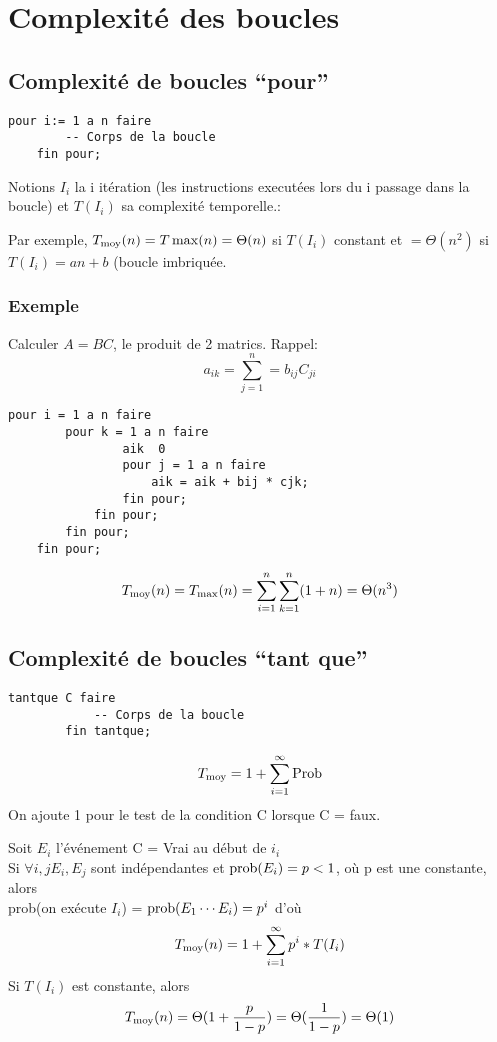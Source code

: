 \chapter{Complexité des boucles}
\minitoc
	\section{Complexité de boucles ``pour''}
\begin{lstlisting}[language=algo]
	pour i:= 1 a n faire
		-- Corps de la boucle
	fin pour;
\end{lstlisting}
Notions $I_i$ la i\ieme{} itération (les instructions executées lors du i\ieme{} passage dans la boucle) et $T(I_i)$ sa complexité temporelle.:

Par exemple, $T_{\textrm{moy}}(n) = T\max(n) = \Theta(n)$ si $T(I_i)$ constant et $= \Theta(n^2)$ si $T(I_i) = an+b$ (boucle imbriquée.

\subsection{Exemple}
Calculer $A=BC$, le produit de 2 matrics. Rappel:
$$a_{ik} = \sum^n_{j=1} = b_{ij}C_{ji}$$
\begin{lstlisting}[language=algo]
	pour i = 1 a n faire
		pour k = 1 a n faire
				aik  0
				pour j = 1 a n faire
					aik = aik + bij * cjk;
				fin pour;
			fin pour;
		fin pour;
	fin pour;
\end{lstlisting}

$$T_{\textrm{moy}}(n) = T_{\max}(n) = \sum^n_{i=1}\sum^n_{k=1}(1+n) = \Theta(n^3)$$

\newpage
	\section{Complexité de boucles ``tant que''}\label{complexiteboucletantque}

	\begin{lstlisting}[language=algo]
		tantque C faire
			-- Corps de la boucle
		fin tantque;
	\end{lstlisting}
	$$T_{\textrm{moy}} = 1 + \sum^\infty_{i=1}\textrm{Prob}$$
	On ajoute 1 pour le test de la condition C lorsque C = faux.

	Soit $E_i$ l'événement C = Vrai au début de $i_i$\\
	Si $\forall i, j E_i, E_j$ sont indépendantes et $\textrm{prob}(E_i) = p < 1$, où p est une constante, alors\\ prob(on exécute $I_i$) = $\textrm{prob}(E_1\cdots E_i) = p^i$ d'où
	$$T_{\textrm{moy}}(n) = 1 + \sum^{\infty}_{i=1}p^i*T(I_i)$$
	Si $T(I_i)$ est constante, alors $$T_{\textrm{moy}}(n) = \Theta (1 + \frac{p}{1-p}) = \Theta (\frac{1}{1-p}) = \Theta(1)$$

